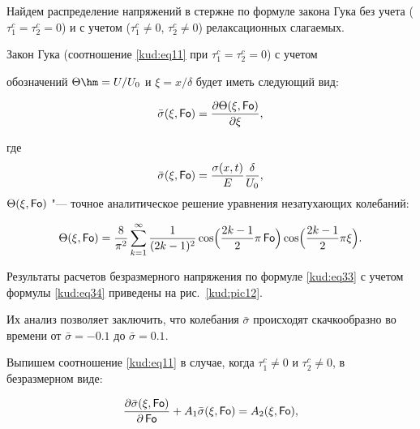 Найдем распределение напряжений в стержне по формуле закона Гука без учета ($\tau_1^c = \tau_2^c =0$) и с учетом ($ \tau_1^c \ne 0$, $ \tau_2^c \ne 0$) релаксационных слагаемых. 

Закон Гука (соотношение \eqref{kud:eq11} при $ \tau_1 ^c= \tau_2 ^c=0$) с учетом

обозначений $ \Theta\hm=U/U_0 $ и $\xi=x/\delta$ будет иметь следующий вид:

\begin{equation}

\label{kud:eq33}

\bar \sigma ( \xi,\operatorname{\sf Fo}) =\frac{\partial  \Theta ( \xi, \operatorname{\sf Fo})} {\partial  \xi},

\end{equation}

где $$ \bar \sigma (\xi,\operatorname{\sf Fo})= \frac {\sigma (x, t)}E \frac \delta{U_0},$$ $\Theta( \xi, \operatorname{\sf Fo})$ "--- точное аналитическое решение уравнения незатухающих колебаний:

\begin{equation}

\label{kud:eq34}

\Theta( \xi,\operatorname{\sf Fo})= \frac{8}{\pi^2} 

\sum\limits_{k=1}^\infty \frac{1}{(2k-1)^2} \cos \Bigl(\frac{2k-1}2 \pi \operatorname{\sf Fo} \Bigr)

\cos \Bigl(\frac{2k-1}2 \pi \xi \Bigr).

\end{equation}



Результаты расчетов безразмерного напряжения по формуле \eqref{kud:eq33} с учетом формулы \eqref{kud:eq34} приведены на рис.~\ref{kud:pic12}. 

Их анализ позволяет заключить, что колебания $\bar \sigma$ происходят скачкообразно во времени от $\bar \sigma=- 0.1$ до $ \bar \sigma=0.1$.



Выпишем соотношение \eqref{kud:eq11} в случае, когда $\tau_1^c \ne 0$ и $ \tau_2^c \ne 0$, в безразмерном виде:

\begin{equation}

\label{kud:eq35}

\frac{ \partial \bar \sigma ( \xi,\operatorname{\sf Fo}) }{\partial \operatorname{\sf Fo}}+A_1  {\bar \sigma}( \xi,\operatorname{\sf Fo}) =A_2 ( \xi,\operatorname{\sf Fo}),

\end{equation}

